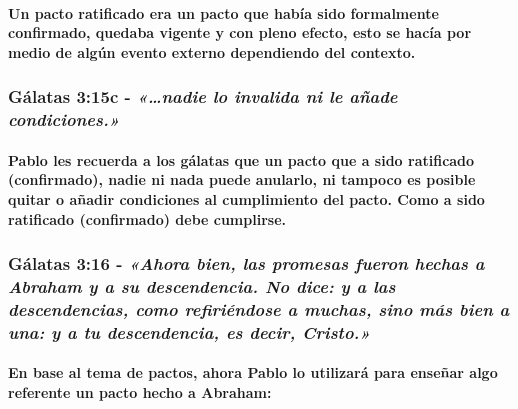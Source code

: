 \documentclass[11a pt,twoside]{article}
\newcommand{\scripture}[1]{%
  {\fontsize{12pt}{16pt}\selectfont\ScriptureFont\itshape #1}%
}
\let\oldsubsubsection\subsubsection
\renewcommand{\subsubsection}{\needspace{4\baselineskip}\oldsubsubsection}
\let\oldparagraph\paragraph
\renewcommand{\paragraph}{\needspace{3\baselineskip}\oldparagraph}
\begin{document}
\paragraph{Un pacto ratificado era un pacto que había sido formalmente
confirmado, quedaba vigente y con pleno efecto, esto se hacía por medio
de algún evento externo dependiendo del
contexto.}\label{un-pacto-ratificado-era-un-pacto-que-habuxeda-sido-formalmente-confirmado-quedaba-vigente-y-con-pleno-efecto-esto-se-hacuxeda-por-medio-de-alguxfan-evento-externo-dependiendo-del-contexto.}

\subsubsection{\texorpdfstring{Gálatas 3:15c -
\scripture{«…nadie lo invalida ni le añade condiciones.»}}{Gálatas 3:15c - }}\label{guxe1latas-315c---nadie-lo-invalida-ni-le-auxf1ade-condiciones.}

\paragraph{Pablo les recuerda a los gálatas que un pacto que a sido
ratificado (confirmado), nadie ni nada puede anularlo, ni tampoco es
posible quitar o añadir condiciones al cumplimiento del pacto. Como a
sido ratificado (confirmado) debe
cumplirse.}\label{pablo-les-recuerda-a-los-guxe1latas-que-un-pacto-que-a-sido-ratificado-confirmado-nadie-ni-nada-puede-anularlo-ni-tampoco-es-posible-quitar-o-auxf1adir-condiciones-al-cumplimiento-del-pacto.-como-a-sido-ratificado-confirmado-debe-cumplirse.}

\subsubsection{\texorpdfstring{Gálatas 3:16 -
\scripture{«Ahora bien, las promesas fueron hechas a Abraham y a su descendencia. No dice: y a las descendencias, como refiriéndose a muchas, sino más bien a una: y a tu descendencia, es decir, Cristo.»}}{Gálatas 3:16 - }}\label{guxe1latas-316---ahora-bien-las-promesas-fueron-hechas-a-abraham-y-a-su-descendencia.-no-dice-y-a-las-descendencias-como-refiriuxe9ndose-a-muchas-sino-muxe1s-bien-a-una-y-a-tu-descendencia-es-decir-cristo.}

\paragraph{En base al tema de pactos, ahora Pablo lo utilizará para
enseñar algo referente un pacto hecho a
Abraham:}\label{en-base-al-tema-de-pactos-ahora-pablo-lo-utilizaruxe1-para-enseuxf1ar-algo-referente-un-pacto-hecho-a-abraham}
\end{document}
